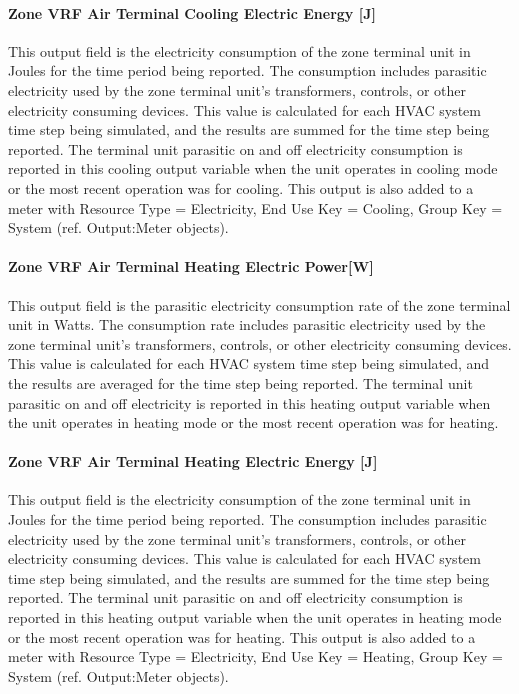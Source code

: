 \paragraph{Zone VRF Air Terminal Cooling Electric Energy {[}J{]}}\label{zone-vrf-air-terminal-cooling-electric-energy-j}

This output field is the electricity consumption of the zone terminal unit in Joules for the time period being reported. The consumption includes parasitic electricity used by the zone terminal unit's transformers, controls, or other electricity consuming devices. This value is calculated for each HVAC system time step being simulated, and the results are summed for the time step being reported. The terminal unit parasitic on and off electricity consumption is reported in this cooling output variable when the unit operates in cooling mode or the most recent operation was for cooling. This output is also added to a meter with Resource Type = Electricity, End Use Key = Cooling, Group Key = System (ref. Output:Meter objects).

\paragraph{Zone VRF Air Terminal Heating Electric Power{[}W{]}}\label{zone-vrf-air-terminal-heating-electric-powerw}

This output field is the parasitic electricity consumption rate of the zone terminal unit in Watts. The consumption rate includes parasitic electricity used by the zone terminal unit's transformers, controls, or other electricity consuming devices. This value is calculated for each HVAC system time step being simulated, and the results are averaged for the time step being reported. The terminal unit parasitic on and off electricity is reported in this heating output variable when the unit operates in heating mode or the most recent operation was for heating.

\paragraph{Zone VRF Air Terminal Heating Electric Energy {[}J{]}}\label{zone-vrf-air-terminal-heating-electric-energy-j}

This output field is the electricity consumption of the zone terminal unit in Joules for the time period being reported. The consumption includes parasitic electricity used by the zone terminal unit's transformers, controls, or other electricity consuming devices. This value is calculated for each HVAC system time step being simulated, and the results are summed for the time step being reported. The terminal unit parasitic on and off electricity consumption is reported in this heating output variable when the unit operates in heating mode or the most recent operation was for heating. This output is also added to a meter with Resource Type = Electricity, End Use Key = Heating, Group Key = System (ref. Output:Meter objects).

